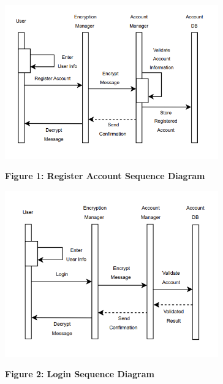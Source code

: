 \documentclass[]{article}
\begin{document}
\begin{figure}[h]
    \centering

    \begin{minipage}[b]{\textwidth}
        \centering
        \includegraphics[width=0.82\textwidth]{RegisterSequenceDiagram.png}
        \vspace{0.1cm}
        
        \textbf{Figure 1: Register Account Sequence Diagram}
    \end{minipage}

    \vspace{0.5cm}

    \begin{minipage}[b]{\textwidth}
        \centering
        \includegraphics[width=0.82\textwidth]{LoginSequenceDiagram.png}
        \vspace{0.1cm}
        
        \textbf{Figure 2: Login Sequence Diagram}
    \end{minipage}
\end{figure}
\end{document}
